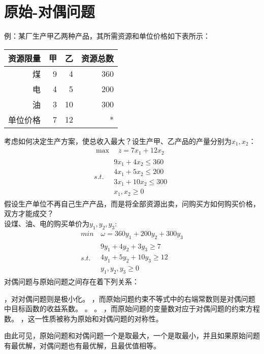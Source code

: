 \documentclass[a4paper,12pt]{article}
\begin{document}
\section{原始-对偶问题}
例：某厂生产甲乙两种产品，其所需资源和单位价格如下表所示：
\begin{center}
\begin{tabular}{|r|r|r|r|} 
\hline
资源限量&甲&乙&资源总数\\
\hline
煤&9&4&360\\
\hline
电&4&5&200\\
\hline
油&3&10&300\\
\hline
单位价格&7&12&*\\
\hline
\end{tabular}
\end{center} 
考虑如何决定生产方案，使总收入最大？设生产甲、乙产品的产量分别为$x_1,x_2$：
\begin{equation}
\begin{array}{l}
\max \quad z=7x_1+12x_2
\\
s.t. \quad
\begin{array}{l}
9x_1+4x_2\le 360\\
4x_1+5x_2\le 200\\
3x_1+10x_2\le 300\\
x_1,x_2\ge 0
\end{array}
\end{array}
\end{equation}
假设生产单位不再自己生产产品，而是将全部资源出卖，问购买方如何购买价格，双方才能成交？
\\
设煤、油、电的购买单价为$y_1,y_2,y_3$:
\begin{equation}
\begin{array}{l}
min \quad \omega=360y_1+200y_2+300y_3
\\
s.t. \quad
\begin{array}{l}
9y_1+4y_2+3y_3\ge 7\\
4y_1+5y_2+10y_3\ge 12\\
y_1,y_2,y_3\ge 0
\end{array}
\end{array}
\end{equation}
对偶问题与原始问题之间存在着下列关系：
\begin{itemize}
，对对偶问题则是极小化。
，而原始问题约束不等式中的右端常数则是对偶问题中目标函数的收益系数。
。
。
，而原始问题的变量数对应于对偶问题的约束方程数。
，这一性质被称为原始和对偶问题的对称性。
\end{itemize}
由此可见，原始问题和对偶问题一个是取最大，一个是取最小，并且如果原始问题有最优解，对偶问题也有最优解，且最优值相等。
\end{document}
